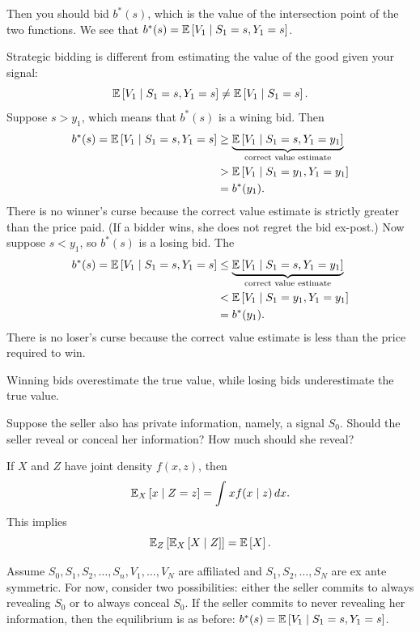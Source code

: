 Then you should bid $b^*(s)$, which is the value of the intersection point of the two functions.
We see that $b^*(s) = \mathbb{E}\left[V_1 \mid S_1 = s, Y_1 = s\right] $.

\begin{remark}	Strategic bidding is different from estimating the value of the good given your signal: \[
		\mathbb{E}\left[V_1 \mid S_1 = s, Y_1 = s\right] \ne \mathbb{E}\left[V_1 \mid S_1 = s\right] 
	.\] 
	Suppose $s>y_1$, which means that $b^*(s)$ is a wining bid. Then 
	\begin{align*}
		b^*(s) = \mathbb{E}\left[V_1 \mid S_1 = s, Y_1 = s\right]
		&\ge \underbrace{\mathbb{E}\left[V_1 \mid S_1= s, Y_1 = y_1\right]}_{\text{correct value estimate}}  \\ &> \mathbb{E}\left[V_1 \mid S_1 = y_1, Y_1 =y_1\right] \\ &= b^*(y_1) .\end{align*} There is no winner's curse because the correct value estimate is strictly greater than the price paid. (If a bidder wins, she does not regret the bid ex-post.) Now suppose $s<y_1$, so $b^*(s)$ is a losing bid. The \begin{align*} b^*(s) = \mathbb{E}\left[V_1 \mid S_1 = s, Y_1 = s\right] &\le \underbrace{\mathbb{E}\left[V_1 \mid S_1 =s, Y_1 = y_1\right]}_{\text{correct value estimate}} \\ &< \mathbb{E}\left[V_1 \mid S_1 = y_1, Y_1 =y_1\right] \\
		&= b^*(y_1)
	.\end{align*}
	There is no loser's curse because the correct value estimate is less than the price required to win.

	Winning bids overestimate the true value, while losing bids underestimate the true value.
\end{remark}

Suppose the seller also has private information, namely, a signal $S_0$. Should the seller reveal or conceal her information? How much should she reveal?

\begin{proposition}	If $X$ and $Z$ have joint density $f(x,z)$, then \[
		\mathbb{E}_X\left[x \mid Z =z\right] = \int_{}^{} x f(x \mid z)\,dx 
	.\] This implies \[
		\mathbb{E}_Z\left[\mathbb{E}_X\left[X \mid Z\right] \right] = \mathbb{E}\left[X\right] 
	.\] 
\end{proposition}

Assume $S_0,S_1,S_2,\ldots,S_n,V_1,\ldots,V_N$ are affiliated and $S_1,S_2,\ldots,S_N$ are ex ante symmetric. For now, consider two possibilities: either the seller commits to always revealing $S_0$ or to always conceal $S_0$. If the seller commits to never revealing her information, then the equilibrium is as before: $b^*(s) = \mathbb{E}\left[V_1 \mid S_1 = s, Y_1= s\right] $.

